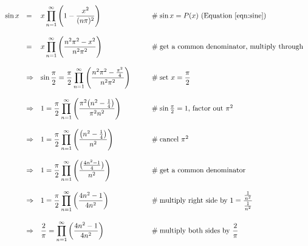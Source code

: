 \documentclass[11pt, oneside]{article}   	%
\begin{document}
\newpage
\begin{equation*}
\begin{array}{lllll}
\sin x
&=&  \mathlarger{x \prod\limits_{n=1}^\infty \Bigg (1 - \dfrac{x^2}{(n\pi)^2} \Bigg )}
		&\qquad \mathrel{\#}  \text{$\sin x = P(x)$ (Equation \ref{eqn:sine})} \\
[22pt]
&=& \mathlarger{x \prod\limits_{n=1}^\infty \Bigg (\dfrac{n^2\pi^2 - x^2}{n^2\pi^2} \Bigg )}                                   
		&\qquad \mathrel{\#}  \text{get a common denominator, multiply through} \\
[22pt]
&\Rightarrow& \mathlarger{\sin \frac{\pi}{2}= \dfrac{\pi}{2} \prod\limits_{n=1}^\infty \Bigg (\dfrac{n^2\pi^2 - \frac{\pi^2}{4}}{n^2\pi^2} \Bigg )}                                                                                                                                                                              		&\qquad \mathrel{\#}  \text{set $\mathlarger{x = \frac{\pi}{2}}$} \\
[22pt]
&\Rightarrow& \mathlarger{1 =  \dfrac{\pi}{2}  \prod\limits_{n=1}^\infty \Bigg ( \dfrac{ \pi^2 \big ( n^2 - \frac{1}{4} \big )} {\pi^2 n^2} \Bigg )}                                                                                                                                                                        		&\qquad \mathrel{\#} \text{$\sin \frac{\pi}{2} = 1 $, factor out $\pi^2$} \\
[22pt]
&\Rightarrow& \mathlarger{1 =  \dfrac{\pi}{2}  \prod\limits_{n=1}^\infty \Bigg ( \dfrac{ \big ( n^2 - \frac{1}{4} \big )} {n^2} \Bigg )}                                                                                                                                                                                 		&\qquad \mathrel{\#}  \text{cancel $\pi^2$} \\
[22pt]
&\Rightarrow&  \mathlarger{1 = \dfrac{\pi}{2}  \prod\limits_{n=1}^\infty \Bigg ( \dfrac{ \big ( \frac{4n^2 - 1}{4}  \big )} {n^2} \Bigg )}
		&\qquad \mathrel{\#}  \text{get a common denominator} \\
[22pt]
&\Rightarrow& \mathlarger{1 = \dfrac{\pi}{2} \prod\limits_{n=1}^\infty \bigg ( \frac {4n^2 - 1} {4n^2} \bigg )} 
		&\qquad \mathrel{\#}  \text{multiply right side by $\mathlarger{1= \frac{\frac{1}{n^2}}{\frac{1}{n^2}}}$} \\
[22pt]
&\Rightarrow&  \mathlarger{\dfrac{2}{\pi} = \prod\limits_{n=1}^\infty \bigg (\frac {4n^2 - 1} {4n^2} \bigg )}            
		&\qquad \mathrel{\#}  \text{multiply both sides by $\dfrac{2}{\pi}$} \\

\end{array}
\end{equation*}
\end{document}
